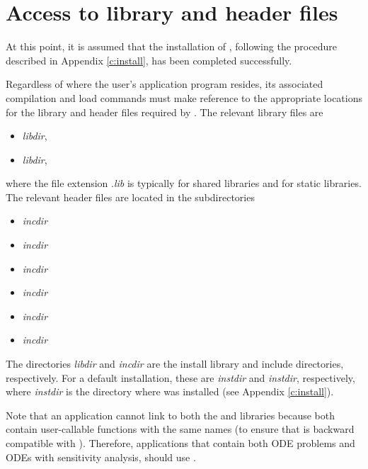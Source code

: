 \section{Access to library and header files}\label{ss:file_access}

At this point, it is assumed that the installation of {\cvodes},
following the procedure described in Appendix \ref{c:install}, has
been completed successfully.

Regardless of where the user's application program resides, its
associated compilation and load commands must make reference to the
appropriate locations for the library and header files required by
{\cvodes}.  The relevant library files are
\begin{itemize}
\item {\em libdir},
\item {\em libdir},
\end{itemize}
where the file extension .{\em lib} is typically  for shared libraries
and  for static libraries. The relevant header files are located in
the subdirectories
\begin{itemize}
\item {\em incdir}
\item {\em incdir}
\item {\em incdir}
\item {\em incdir}
\item {\em incdir}
\item {\em incdir}
\end{itemize}
The directories {\em libdir} and {\em incdir} are the install library and include
directories, respectively. For a default installation, these are {\em instdir} and
{\em instdir}, respectively, where {\em instdir} is the directory
where {\sundials} was installed (see Appendix \ref{c:install}).

Note that an application cannot link to both the {\cvode} and {\cvodes} libraries
because both contain user-callable functions with the same names (to ensure that
{\cvodes} is backward compatible with {\cvode}). Therefore, applications that contain
both ODE problems and ODEs with sensitivity analysis, should use {\cvodes}.



